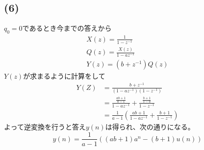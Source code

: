 \documentclass[a4paper,12pt,xelatex,ja=standard]{bxjsarticle}
\begin{document}
  \subsection*{(6)}
  $q_0=0$であるとき今までの答えから
  \begin{equation*}
    \begin{split}
      X(z) = \frac{1}{1 - z^{-1}} \\
      Q(z) = \frac{X(z)}{1 - az^{-1}} \\
      Y(z) = (b + z^{-1})Q(z)
    \end{split}
  \end{equation*}
  $Y(z)$が求まるように計算をして
  \begin{equation*}
    \begin{split}
      Y(Z)
        &= \frac{b + z^{-1}}{(1 - az^{-1})(1 - z^{-1})} \\
        &= \frac{\frac{ab+1}{a-1}}{1 - az^{-1}} + \frac{\frac{b+1}{1-a}}{1 - z^{-1}} \\
        &= \frac{1}{a - 1}\left(\frac{ab+1}{1 - az^{-1}} + \frac{b+1}{1 - z^{-1}}  \right)
    \end{split}
  \end{equation*}
  よって逆変換を行うと答え$y(n)$は得られ、次の通りになる。
  \[
    y(n) = \frac{1}{a-1}\left( (ab+1)a^{n} - (b+1)u(n) \right)
  \]
\end{document}
